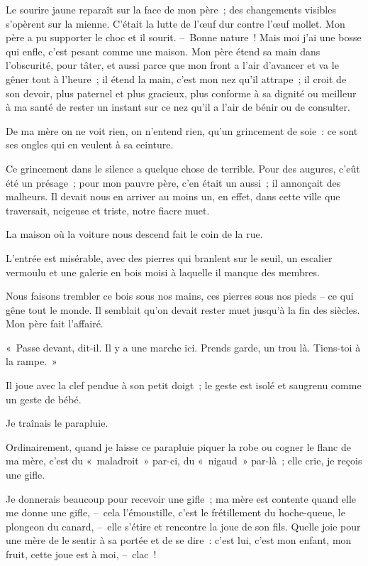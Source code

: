 \documentclass[french,twoside]{book} %
\begin{document}
Le sourire jaune reparaît sur la face de mon père ; des changements visibles s’opèrent sur la mienne. C’était la lutte de l’œuf dur contre l’œuf mollet. Mon père a pu supporter le choc et il sourit. – Bonne nature ! Mais moi j’ai une bosse qui enfle, c’est pesant comme une maison. Mon père étend sa main dans l’obscurité, pour tâter, et aussi parce que mon front a l’air d’avancer et va le gêner tout à l’heure ; il étend la main, c’est mon nez qu’il attrape ; il croit de son devoir, plus paternel et plus gracieux, plus conforme à sa dignité ou meilleur à ma santé de rester un instant sur ce nez qu’il a l’air de bénir ou de consulter.\par
De ma mère on ne voit rien, on n’entend rien, qu’un grincement de soie : ce sont ses ongles qui en veulent à sa ceinture.\par
Ce grincement dans le silence a quelque chose de terrible. Pour des augures, c’eût été un présage ; pour mon pauvre père, c’en était un aussi ; il annonçait des malheurs. Il devait nous en arriver au moins un, en effet, dans cette ville que traversait, neigeuse et triste, notre fiacre muet.\par
\bigbreak
\noindent La maison où la voiture nous descend fait le coin de la rue.\par
L’entrée est misérable, avec des pierres qui branlent sur le seuil, un escalier vermoulu et une galerie en bois moisi à laquelle il manque des membres.\par
Nous faisons trembler ce bois sous nos mains, ces pierres sous nos pieds – ce qui gêne tout le monde. Il semblait qu’on devait rester muet jusqu’à la fin des siècles. Mon père fait l’affairé.\par
« Passe devant, dit-il. Il y a une marche ici. Prends garde, un trou là. Tiens-toi à la rampe. »\par
Il joue avec la clef pendue à son petit doigt ; le geste est isolé et saugrenu comme un geste de bébé.\par
Je traînais le parapluie.\par
Ordinairement, quand je laisse ce parapluie piquer la robe ou cogner le flanc de ma mère, c’est du « maladroit » par-ci, du « nigaud » par-là ; elle crie, je reçois une gifle.\par
Je donnerais beaucoup pour recevoir une gifle ; ma mère est contente quand elle me donne une gifle, – cela l’émoustille, c’est le frétillement du hoche-queue, le plongeon du canard, – elle s’étire et rencontre la joue de son fils. Quelle joie pour une mère de le sentir à sa portée et de se dire : c’est lui, c’est mon enfant, mon fruit, cette joue est à moi, – clac !\par
\end{document}
